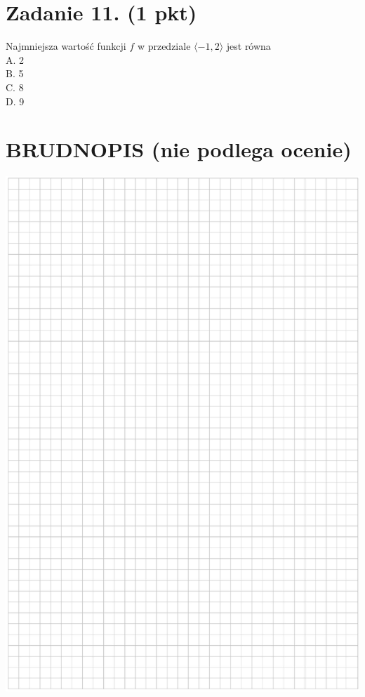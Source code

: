 \documentclass[10pt]{article}
\begin{document}
\section*{Zadanie 11. (1 pkt)}
Najmniejsza wartość funkcji \(f\) w przedziale \(\langle-1,2\rangle\) jest równa\\
A. 2\\
B. 5\\
C. 8\\
D. 9

\section*{BRUDNOPIS (nie podlega ocenie)}
\begin{center}
\includegraphics[max width=\textwidth]{2024_11_21_779b7f825da3a12753feg-05}
\end{center}
\end{document}
